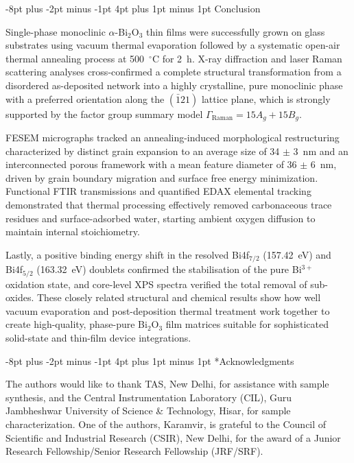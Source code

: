 \documentclass[10pt]{NSP1}
\makeatletter
\renewcommand\section{\@startsection{section}{1}{\z@}%
  {-8pt plus -2pt minus -1pt}%
  {4pt plus 1pt minus 1pt}%
  {\normalsize\bfseries}}
\makeatother
\begin{document}
\section{Conclusion}

Single-phase monoclinic $\alpha$-Bi$_2$O$_3$ thin films were successfully grown on glass substrates using vacuum thermal evaporation followed by a systematic open-air thermal annealing process at 500~$^\circ$C for 2~h. X-ray diffraction and laser Raman scattering analyses cross-confirmed a complete structural transformation from a disordered as-deposited network into a highly crystalline, pure monoclinic phase with a preferred orientation along the $(\bar{1}21)$ lattice plane, which is strongly supported by the factor group summary model $\Gamma_{\text{Raman}} = 15A_g + 15B_g$.

FESEM micrographs tracked an annealing-induced morphological restructuring characterized by distinct grain expansion to an average size of 34 $\pm$ 3~nm and an interconnected porous framework with a mean feature diameter of 36 $\pm$ 6~nm, driven by grain boundary migration and surface free energy minimization. Functional FTIR transmissions and quantified EDAX elemental tracking demonstrated that thermal processing effectively removed carbonaceous trace residues and surface-adsorbed water, starting ambient oxygen diffusion to maintain internal stoichiometry.

Lastly, a positive binding energy shift in the resolved Bi4f$_{7/2}$ (157.42~eV) and Bi4f$_{5/2}$ (163.32~eV) doublets confirmed the stabilisation of the pure Bi$^{3+}$ oxidation state, and core-level XPS spectra verified the total removal of sub-oxides. These closely related structural and chemical results show how well vacuum evaporation and post-deposition thermal treatment work together to create high-quality, phase-pure Bi$_2$O$_3$ film matrices suitable for sophisticated solid-state and thin-film device integrations.

\section*{Acknowledgments}

The authors would like to thank TAS, New Delhi, for assistance with sample synthesis, and the Central Instrumentation Laboratory (CIL), Guru Jambheshwar University of Science \& Technology, Hisar, for sample characterization. One of the authors, Karamvir, is grateful to the Council of Scientific and Industrial Research (CSIR), New Delhi, for the award of a Junior Research Fellowship/Senior Research Fellowship (JRF/SRF).
\end{document}
